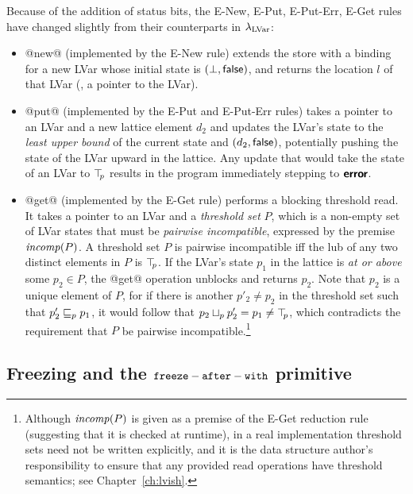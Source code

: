 Because of the addition of status bits, the {\sc E-New}, {\sc E-Put},
{\sc E-Put-Err}, {\sc E-Get} rules have changed slightly from their
counterparts in $\lambda_{\textrm{LVar}}$:

\begin{itemize}
\item @new@ (implemented by the {\sc E-New} rule) extends the store
  with a binding for a new LVar whose initial state is $(\bot,
  \textsf{false})$, and returns the location $l$ of that LVar (\ie, a
  pointer to the LVar).
\item @put@ (implemented by the {\sc E-Put} and {\sc E-Put-Err} rules)
  takes a pointer to an LVar and a new lattice element $d_2$ and
  updates the LVar's state to the \emph{least upper bound} of the
  current state and $(d_2, \textsf{false})$, potentially pushing
  the state of the LVar upward in the lattice.  Any update that would
  take the state of an LVar to $\top\hspace{-0.85mm}_{p}$ results in the program
  immediately stepping to $\textbf{\textsf{error}}$.
\item @get@ (implemented by the {\sc E-Get} rule) performs a blocking
  threshold read.  It takes a pointer to an LVar and a \emph{threshold
    set} $P$, which is a non-empty set of LVar states that must be
  \emph{pairwise incompatible}, expressed by the premise $\mathit{incomp}(P)$.
  A threshold set $P$ is pairwise incompatible iff the lub of any two
  distinct elements in $P$ is $\top\hspace{-0.85mm}_{p}$.  If the LVar's state $p_1$ in
  the lattice is \emph{at or above} some $p_2 \in P$, the @get@
  operation unblocks and returns $p_2$.  Note that $p_2$ is a unique
  element of $P$, for if there is another $p'_2 \neq p_2$ in the
  threshold set such that $p'_2 \sqsubseteq_p p_1$, it would follow that
  $p_2 \sqcup_p p'_2 = p_1 \neq \top\hspace{-0.85mm}_{p}$, which contradicts the
  requirement that $P$ be pairwise incompatible.\footnote{Although
    $\mathit{incomp}(P)$ is given as a premise of the {\sc E-Get} reduction
    rule (suggesting that it is checked at runtime), in a real
    implementation threshold sets need not be written explicitly, and
    it is the data structure author's responsibility to ensure that
    any provided read operations have threshold semantics; see
    Chapter~\ref{ch:lvish}.}
\end{itemize}

\subsection{Freezing and the ${\mbox{\texttt{freeze}}-\mbox{\texttt{after}}-\mbox{\texttt{with}}}$ primitive}\label{subsection:quasi-freezing}

